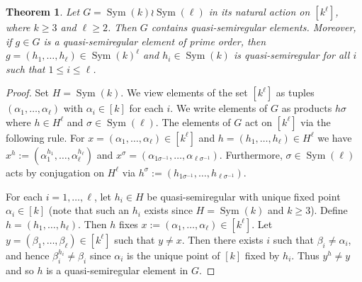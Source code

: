 \documentclass{article}
\newtheorem{thm}{Theorem}[section]
\theoremstyle{remark}
\theoremstyle{definition}
\DeclareMathOperator{\Sym}{Sym}
\newcommand{\qsr}{quasi-semiregular}
\newcommand{\qsre}{quasi-semiregular element}
\newcommand{\qsres}{quasi-semiregular elements}
\begin{document}
 
\begin{thm}\label{t:pa}
Let $G= \Sym(k)\wr\Sym(\ell)$ in its natural action on $[k^\ell]$, where $k\geqslant3$ and $\ell\geqslant2$. Then $G$ contains {\qsres}. Moreover, if $g\in G$ is a {\qsre} of prime order, then  $g=(h_1,\ldots,h_\ell)\in \Sym(k)^\ell$ and   $h_i\in \Sym(k)$ is  {\qsr} for all $i$ such that $1\leqslant i\leqslant \ell$.
\end{thm}
\begin{proof}
    Set $H=\Sym(k)$. We view elements of the set   $[k^\ell]$   as tuples $(\alpha_1,\ldots,\alpha_\ell)$ with $\alpha_i\in [k]$ for each $i$. We write elements of $G$ as products $h\sigma $ where $h\in H^\ell$ and $\sigma \in \Sym(\ell)$.  The elements of $G$  act on $[k^\ell]$ via the following rule. For $x=(\alpha_1,\ldots,\alpha_\ell)\in [k^\ell]$ and $h=(h_1,\ldots,h_\ell)\in H^\ell$ we have $x^h :=  (\alpha_1^{h_1},\ldots,\alpha_\ell^{h_\ell})$ and $x^\sigma  = (\alpha_{1\sigma^{-1}},\ldots,\alpha_{\ell\sigma^{-1}})$. Furthermore, $\sigma \in \Sym(\ell)$ acts by conjugation on $ H^\ell$ via $h^\sigma  := (h_{1\sigma^{-1}},\ldots,h_{\ell\sigma^{-1}})$.

    For each $i=1,\dots, \ell$, let  $h_i \in H$ be quasi-semiregular with unique fixed point $\alpha_i \in [k]$ (note that such an $h_i$ exists since $H=\Sym(k)$ and $k\geqslant3$). Define $h=(h_1,\ldots,h_\ell)$. Then $h$ fixes $x:=(\alpha_1,\ldots,\alpha_\ell)\in [k^\ell]$.  Let $y = (\beta_1,\ldots,\beta_\ell) \in  [k^\ell]$  such that $y \neq x$. Then there exists $i$ such that  $\beta_i\neq \alpha_i $, and hence $\beta_i^{h_i} \neq \beta_i$ since $\alpha_i$ is the unique point of $[k]$ fixed by $h_i$. Thus $y^h \neq y$ and so  $h$ is a {{\qsre}} in $G$.


\end{proof}
\end{document}
